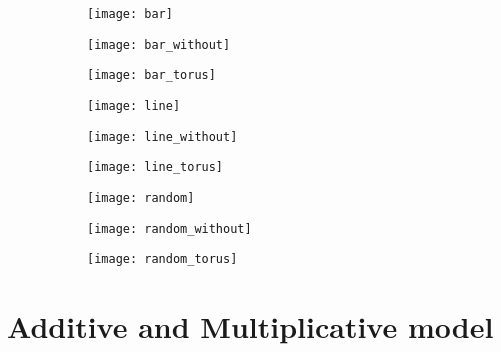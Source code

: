 \begin{figure}[H]
\caption{}
\begin{subfigure}{.33\textwidth}
  \centering
  \texttt{[image: bar]}
\end{subfigure}%
\hfill
\begin{subfigure}{.33\textwidth}
  \centering
  \texttt{[image: bar\_without]}
\end{subfigure}
\hfill
\begin{subfigure}{.33\textwidth}
  \centering
  \texttt{[image: bar\_torus]}
\end{subfigure}%
\hfill
\begin{subfigure}{.33\textwidth}
  \centering
  \texttt{[image: line]}
\end{subfigure}
\hfill
\begin{subfigure}{.33\textwidth}
  \centering
  \texttt{[image: line\_without]}
\end{subfigure}%
\hfill
\begin{subfigure}{.33\textwidth}
  \centering
  \texttt{[image: line\_torus]}
\end{subfigure}
\hfill
\begin{subfigure}{.33\textwidth}
  \centering
  \texttt{[image: random]}
\end{subfigure}%
\hfill
\begin{subfigure}{.33\textwidth}
  \centering
  \texttt{[image: random\_without]}
\end{subfigure}%
\hfill
\begin{subfigure}{.33\textwidth}
  \centering
  \texttt{[image: random\_torus]}
\end{subfigure}
\end{figure}



\section{Additive and Multiplicative model}

